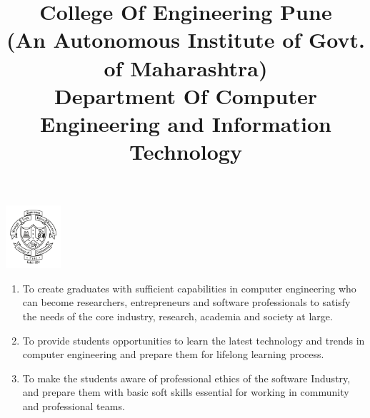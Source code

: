 \documentclass[a4paper]{article}
\title{
	 College Of Engineering Pune\\
	\small{(An Autonomous Institute of Govt. of Maharashtra)}\\
	\large{Department Of Computer Engineering and Information Technology}	
}
\author{
	\noindent{
		\large{Programme: B.Tech (Computer Engineering)}
	}
}
\date{}
\begin{document}
\pagecolor{gray}

\begin{minipage}{.83\textwidth}
	\maketitle
\end{minipage}
\begin{minipage}{.1\textwidth}
	\hfill{\includegraphics[width=0.8in]{./logo.png}}
\end{minipage}


\begin{enumerate}
\item To create graduates with sufficient capabilities in computer engineering who can become researchers, entrepreneurs and software professionals to satisfy the needs of the core industry, research, academia and society at large.

\item To provide students opportunities to learn the latest technology and trends in computer engineering and prepare them for lifelong learning process.

\item To make the students aware of professional ethics of the software Industry, and prepare them with basic soft skills essential for working in community and professional teams.
\end{enumerate} 


\end{document}
